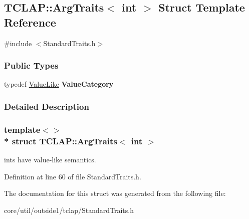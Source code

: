 \hypertarget{structTCLAP_1_1ArgTraits_3_01int_01_4}{}\subsection{T\+C\+L\+AP\+:\+:Arg\+Traits$<$ int $>$ Struct Template Reference}
\label{structTCLAP_1_1ArgTraits_3_01int_01_4}


{\ttfamily \#include $<$Standard\+Traits.\+h$>$}

\subsubsection*{Public Types}
\begin{DoxyCompactItemize}
\item 
typedef \hyperlink{structTCLAP_1_1ValueLike}{Value\+Like} {\bfseries Value\+Category}\hypertarget{structTCLAP_1_1ArgTraits_3_01int_01_4_a8e577764b626e9e928d71567123d92a9}{}\label{structTCLAP_1_1ArgTraits_3_01int_01_4_a8e577764b626e9e928d71567123d92a9}

\end{DoxyCompactItemize}


\subsubsection{Detailed Description}
\subsubsection*{template$<$$>$\\*
struct T\+C\+L\+A\+P\+::\+Arg\+Traits$<$ int $>$}

ints have value-\/like semantics. 

Definition at line 60 of file Standard\+Traits.\+h.



The documentation for this struct was generated from the following file\+:\begin{DoxyCompactItemize}
\item 
core/util/outside1/tclap/Standard\+Traits.\+h\end{DoxyCompactItemize}
